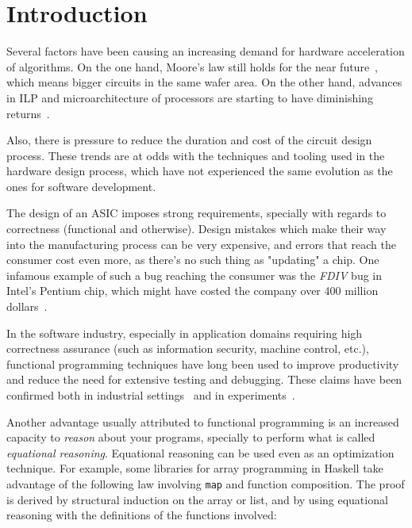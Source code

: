 \chapter{Introduction}
\label{chap:intro}
    Several factors have been causing an increasing demand for hardware acceleration of algorithms.
    On the one hand, Moore's law still holds for the near future~\cite{itrs},
    which means bigger circuits in the same wafer area.
    On the other hand, advances in \ac{ILP} and microarchitecture of processors
    are starting to have diminishing returns~\cite{dark-silicon}.

    Also, there is pressure to reduce the duration and cost of the circuit design process.
    These trends are at odds with the techniques and tooling used in the hardware design process,
    which have not experienced the same evolution as the ones for software development.

    The design of an \ac{ASIC} imposes strong requirements,
    specially with regards to correctness (functional and otherwise).
    Design mistakes which make their way into the manufacturing process can be very expensive,
    and errors that reach the consumer cost even more, as there's no such thing as "updating" a chip.
    One infamous example of such a bug reaching the consumer was the \emph{FDIV} bug in Intel's Pentium chip,
    which might have costed the company over 400 million dollars~\cite{intel-fdiv}.

    In the software industry, especially in application domains requiring high correctness assurance
    (such as information security, machine control, etc.),
    functional programming techniques have long been used to improve productivity
    and reduce the need for extensive testing and debugging.
    These claims have been confirmed both in industrial settings~\cite{haskell-productivity-wiger}
    and in experiments~\cite{haskell-productivity-hudak}.

    Another advantage usually attributed to functional programming is an increased capacity to
    \emph{reason} about your programs, specially to perform what is called \emph{equational reasoning}.
    Equational reasoning can be used even as an optimization technique.
    For example, some libraries for array programming in Haskell take advantage of the following
    law involving \texttt{map} and function composition.
    The proof is derived by structural induction on the array or list,
    and by using equational reasoning with the definitions of the functions involved:

